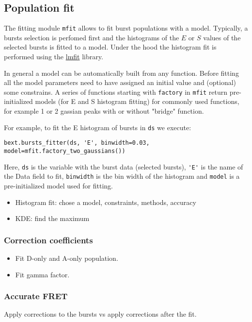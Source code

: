 
\subsection{Population fit}

The fitting module \verb|mfit| allows to fit burst populations with a model. Typically, a bursts selection is perfomed first and the histograms of the $E$ or $S$ values of the selected bursts is fitted to a model. Under the hood the
histogram fit is performed using the \href{http://lmfit.github.io/lmfit-py/}{lmfit} library.

In general a model can be automatically built from any function. Before fitting all the model parameters need to have assigned an initial value and (optional) some constrains. A series of functions starting with \verb|factory| in \verb|mfit| return pre-initialized models (for E and S histogram fitting) for commonly used functions, for example 1 or 2 gassian peaks with or without "bridge" function.

For example, to fit the E histogram of bursts in \verb|ds| we execute:

\begin{verbatim}
bext.bursts_fitter(ds, 'E', binwidth=0.03, model=mfit.factory_two_gaussians())
\end{verbatim}

Here, \verb|ds| is the variable with the burst data (selected bursts), \verb|'E'| is the name of the Data field to fit, \verb|binwidth| is the bin width of the histogram and \verb|model| is a pre-initialized model used for fitting.

\begin{itemize}
\item Histogram fit: chose a model, constraints, methods, accuracy
\item KDE: find the maximum
\end{itemize}

\subsubsection{Correction coefficients}


\begin{itemize}
\item Fit D-only and A-only population.
\item Fit gamma factor.
\end{itemize}


\subsubsection{Accurate FRET}

Apply corrections to the bursts vs apply corrections after the fit.

